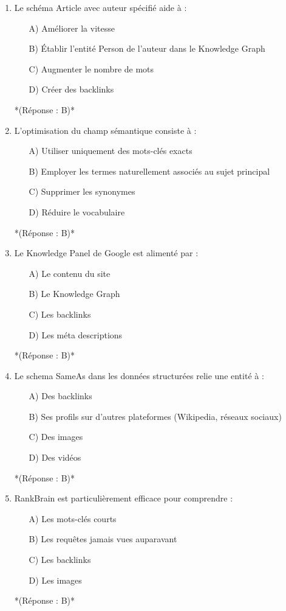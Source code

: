 \documentclass[12pt,a4paper,twoside]{report}
\begin{document}
\begin{enumerate}
\item Le schéma Article avec auteur spécifié aide à :
\begin{itemize}
\item[A)] Améliorer la vitesse
\item[B)] Établir l'entité Person de l'auteur dans le Knowledge Graph
\item[C)] Augmenter le nombre de mots
\item[D)] Créer des backlinks
\end{itemize}
*(Réponse : B)*

\item L'optimisation du champ sémantique consiste à :
\begin{itemize}
\item[A)] Utiliser uniquement des mots-clés exacts
\item[B)] Employer les termes naturellement associés au sujet principal
\item[C)] Supprimer les synonymes
\item[D)] Réduire le vocabulaire
\end{itemize}
*(Réponse : B)*

\item Le Knowledge Panel de Google est alimenté par :
\begin{itemize}
\item[A)] Le contenu du site
\item[B)] Le Knowledge Graph
\item[C)] Les backlinks
\item[D)] Les méta descriptions
\end{itemize}
*(Réponse : B)*

\item Le schema SameAs dans les données structurées relie une entité à :
\begin{itemize}
\item[A)] Des backlinks
\item[B)] Ses profils sur d'autres plateformes (Wikipedia, réseaux sociaux)
\item[C)] Des images
\item[D)] Des vidéos
\end{itemize}
*(Réponse : B)*

\item RankBrain est particulièrement efficace pour comprendre :
\begin{itemize}
\item[A)] Les mots-clés courts
\item[B)] Les requêtes jamais vues auparavant
\item[C)] Les backlinks
\item[D)] Les images
\end{itemize}
*(Réponse : B)*


\end{enumerate}
\end{document}
